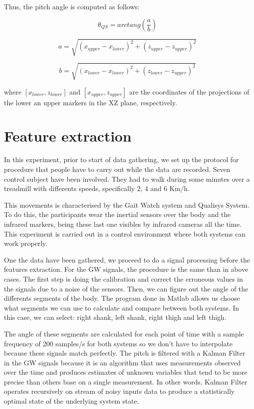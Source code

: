 Thus, the pitch angle is computed as follows:

\begin{equation}
\label{angleQS1}
	\theta_{QS}= arctang(\frac{a}{b})
\end{equation}

\begin{equation}
\label{angleQS2}
	a= \sqrt{(x_{upper}-x_{lower})^{2} + (z_{upper}-z_{upper})^{2} }
\end{equation}

\begin{equation}
\label{angleQS3}
	b= \sqrt{(x_{lower}-x_{lower})^{2} + (z_{lower}-z_{upper})^{2} }
\end{equation}

where $ [x_{lower}, z_{lower} ] $ and $ [x_{upper}, z_{upper} ] $ are the coordinates of the projections of the lower an upper markers in the XZ plane, respectively.

\section{Feature extraction}
In this experiment, prior to start of data gathering, we set up the protocol for procedure that people have to carry out while the data are recorded. Seven control subject have been involved. They had to walk during some minutes over a treadmill with differents speeds, specifically 2, 4 and 6 Km/h.

This movements is characterised by the Gait Watch system and Qualisys System. To do this, the participants wear the inertial sensors over the body and the infrared markers, being these last one visibles by infrared cameras all the time. This experiment is carried out in a control environment where both systems can work properly.

One the data have been gathered, we proceed to do a signal processing before the features extraction. For the GW signals, the procedure is the same than in above cases. The first step is doing the calibration and correct the erroneous values in the signals due to a noise of the sensors.
Then, we can figure out the angle of the differents segments of the body. The program done in Matlab allows us choose what segments we can use to calculate and compare between both systems. In this case, we can select: right shank, left shank, right thigh and left thigh.

The angle of these segments are calculated for each point of time with a sample frequency of 200 samples/s for both systems so we don’t have to interpolate because these signals match perfectly. The pitch is filtered with a Kalman Filter in the GW signals because it is an algorithm that uses measurements observed over the time and produces estimates of unknown variables that tend to be more precise than others base on a single measurement. In other words, Kalman Filter operates recursively on stream of noisy inputs data to produce a statistically optimal state of the underlying system state\cite{Kalman Filter}.

